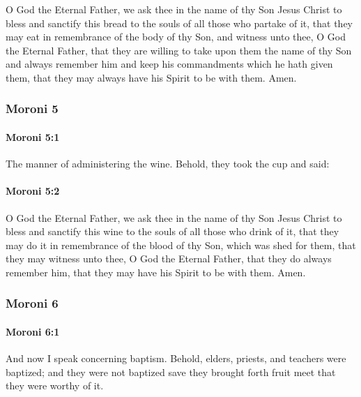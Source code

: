 			O God the Eternal Father,
			we ask thee in the name of thy Son Jesus Christ
			to bless and sanctify this bread
			to the souls of all those who partake of it,
			that they may eat in remembrance of the body of thy Son,
			and witness unto thee, O God the Eternal Father,
			that they are willing to take upon them the name of thy Son
			and always remember him
			and keep his commandments which he hath given them,
			that they may always have his Spirit to be with them.
			Amen.

	\subsubsection{Moroni 5} %
		\label{MORONI-5}
		
		\paragraph{Moroni 5:1} %
			\label{MORONI-5-1}

			The manner of administering the wine.
			Behold, they took the cup and said:

		\paragraph{Moroni 5:2} %
			\label{MORONI-5-2}

			O God the Eternal Father,
			we ask thee in the name of thy Son Jesus Christ
			to bless and sanctify this wine
			to the souls of all those who drink of it,
			that they may do it in remembrance of the blood of thy Son,
			which was shed for them,
			that they may witness unto thee, O God the Eternal Father,
			that they do always remember him,
			that they may have his Spirit to be with them.
			Amen.

	\subsubsection{Moroni 6} %
		\label{MORONI-6}
		
		\paragraph{Moroni 6:1} %
			\label{MORONI-6-1}

			And now I speak concerning baptism.
			Behold, elders, priests, and teachers were baptized;
			and they were not baptized
			save they brought forth fruit meet that they were worthy of it.

